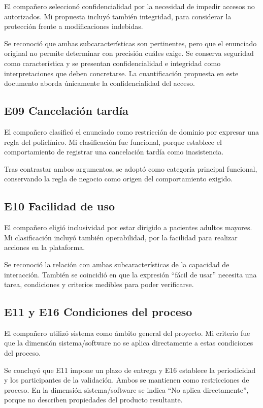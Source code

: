 \documentclass[11pt,a4paper]{article}
\begin{document}
El compañero seleccionó confidencialidad por la
necesidad de impedir accesos no autorizados.
Mi propuesta incluyó también integridad,
para considerar la protección frente a
modificaciones indebidas.

Se reconoció que ambas subcaracterísticas
son pertinentes, pero que el enunciado
original no permite determinar con precisión
cuáles exige. Se conserva seguridad como
característica y se presentan confidencialidad
e integridad como interpretaciones que deben
concretarse. La cuantificación propuesta
en este documento aborda únicamente
la confidencialidad del acceso.

\subsection{E09 Cancelación tardía}

El compañero clasificó el enunciado como restricción
de dominio por expresar una regla del
policlínico. Mi clasificación fue funcional,
porque establece el comportamiento de
registrar una cancelación tardía como
inasistencia.

Tras contrastar ambos argumentos, se adoptó
como categoría principal funcional,
conservando la regla de negocio como origen
del comportamiento exigido.

\subsection{E10 Facilidad de uso}

El compañero eligió inclusividad por estar dirigido
a pacientes adultos mayores. Mi clasificación
incluyó también operabilidad, por la facilidad
para realizar acciones en la plataforma.

Se reconoció la relación con ambas
subcaracterísticas de la capacidad de
interacción. También se coincidió en que
la expresión ``fácil de usar'' necesita
una tarea, condiciones y criterios medibles
para poder verificarse.

\subsection{E11 y E16 Condiciones del proceso}

El compañero utilizó sistema como ámbito general
del proyecto. Mi criterio fue que la dimensión
sistema/software no se aplica directamente
a estas condiciones del proceso.

Se concluyó que E11 impone un plazo de
entrega y E16 establece la periodicidad
y los participantes de la validación.
Ambos se mantienen como restricciones
de proceso. En la dimensión sistema/software
se indica ``No aplica directamente'',
porque no describen propiedades del
producto resultante.
\end{document}
